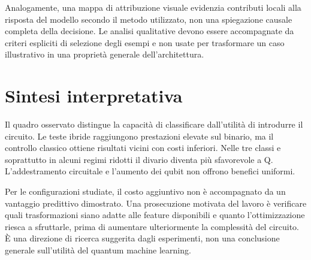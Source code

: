 Analogamente, una mappa di attribuzione visuale evidenzia contributi
locali alla risposta del modello secondo il metodo utilizzato,
non una spiegazione causale completa della decisione. Le analisi
qualitative devono essere accompagnate da criteri espliciti di
selezione degli esempi e non usate per trasformare un caso
illustrativo in una proprietà generale dell'architettura.

\section{Sintesi interpretativa}

Il quadro osservato distingue la capacità di classificare dall'utilità
di introdurre il circuito. Le teste ibride raggiungono prestazioni
elevate sul binario, ma il controllo classico ottiene risultati
vicini con costi inferiori. Nelle tre classi e soprattutto in
alcuni regimi ridotti il divario diventa più sfavorevole a Q.
L'addestramento circuitale e l'aumento dei qubit non offrono
benefici uniformi.

Per le configurazioni studiate, il costo aggiuntivo non è accompagnato
da un vantaggio predittivo dimostrato. Una prosecuzione motivata del
lavoro è verificare quali trasformazioni siano adatte alle feature
disponibili e quanto l'ottimizzazione riesca a sfruttarle, prima di
aumentare ulteriormente la complessità del circuito. È una direzione
di ricerca suggerita dagli esperimenti, non una conclusione generale
sull'utilità del quantum machine learning.
